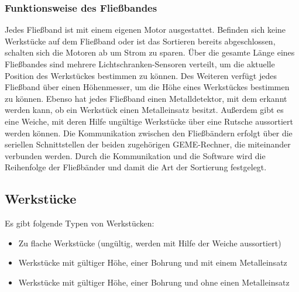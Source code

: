 \documentclass[oneside,a4paper,titlepage]{scrartcl} %
\begin{document}
\subsubsection{Funktionsweise des Fließbandes}
Jedes Fließband ist mit einem eigenen Motor ausgestattet. Befinden sich keine Werkstücke auf dem Fließband oder ist das Sortieren bereits abgeschlossen, schalten sich die Motoren ab um Strom zu sparen.\newline
\newline
Über die gesamte Länge eines Fließbandes sind mehrere Lichtschranken-Sensoren verteilt, um die aktuelle Position des Werkstückes bestimmen zu können.\newline
\newline
Des Weiteren verfügt jedes Fließband über einen Höhenmesser, um die Höhe eines Werkstückes bestimmen zu können.\newline
\newline
Ebenso hat jedes Fließband einen Metalldetektor, mit dem erkannt werden kann, ob ein Werkstück einen Metalleinsatz besitzt.\newline
\newline
Außerdem gibt es eine Weiche, mit deren Hilfe ungültige Werkstücke über eine Rutsche aussortiert werden können.\newline
\newline
Die Kommunikation zwischen den Fließbändern erfolgt über die seriellen Schnittstellen der beiden zugehörigen GEME-Rechner, die miteinander verbunden werden.\newline
\newline
Durch die Kommunikation und die Software wird die Reihenfolge der Fließbänder und damit die Art der Sortierung festgelegt.

\subsection{Werkstücke}
Es gibt folgende Typen von Werkstücken:
\begin{itemize}
    \item Zu flache Werkstücke (ungültig, werden mit Hilfe der Weiche aussortiert)
    \item Werkstücke mit gültiger Höhe, einer Bohrung und mit einem Metalleinsatz
    \item Werkstücke mit gültiger Höhe, einer Bohrung und ohne einen Metalleinsatz
\end{itemize}

\newpage
\end{document}

